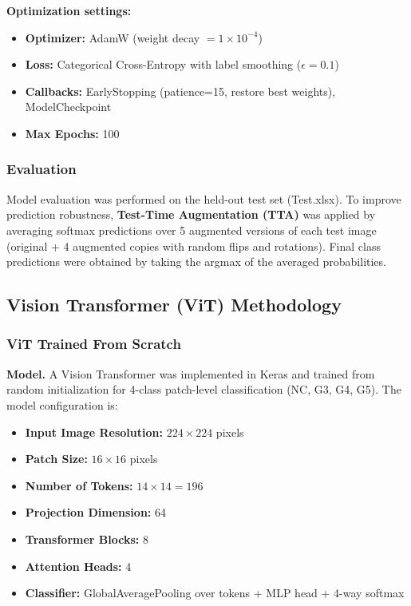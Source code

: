\documentclass[conference]{IEEEtran}
\begin{document}
\textbf{Optimization settings:}
\begin{itemize}
    \item \textbf{Optimizer:} AdamW (weight decay $= 1 \times 10^{-4}$)
    \item \textbf{Loss:} Categorical Cross-Entropy with label smoothing ($\epsilon = 0.1$)
    \item \textbf{Callbacks:} EarlyStopping (patience=15, restore best weights), ModelCheckpoint
    \item \textbf{Max Epochs:} 100
\end{itemize}

\subsubsection{\textbf{Evaluation}}
Model evaluation was performed on the held-out test set (Test.xlsx). To improve prediction robustness, \textbf{Test-Time Augmentation (TTA)} was applied by averaging softmax predictions over 5 augmented versions of each test image (original + 4 augmented copies with random flips and rotations). Final class predictions were obtained by taking the argmax of the averaged probabilities.


\subsection{\textbf{Vision Transformer (ViT) Methodology}}

\subsubsection{\textbf{ViT Trained From Scratch}}

\textbf{Model.}
A Vision Transformer was implemented in Keras and trained from random initialization for 4-class patch-level classification (NC, G3, G4, G5). The model configuration is:
\begin{itemize}
    \item \textbf{Input Image Resolution:} $224\times224$ pixels
    \item \textbf{Patch Size:} $16\times16$ pixels
    \item \textbf{Number of Tokens:} $14\times14 = 196$
    \item \textbf{Projection Dimension:} 64
    \item \textbf{Transformer Blocks:} 8
    \item \textbf{Attention Heads:} 4
    \item \textbf{Classifier:} GlobalAveragePooling over tokens + MLP head + 4-way softmax
\end{itemize}
\end{document}
